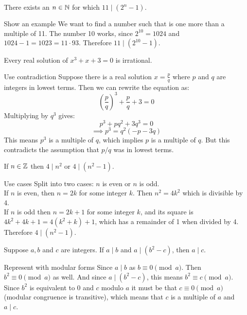 \documentclass{article}
\begin{document}
\begin{problem}
There exists an $n \in \mathbb{N}$ for which $11 \mid (2^n - 1)$.
\end{problem}
\begin{solution}{Show an example}
    We want to find a number such that is one more than a multiple of 11. The number 10 works, since $2^{10} = 1024$ and $1024 - 1 = 1023 = 11\cdot 93$. Therefore $11 \mid (2^{10} - 1)$.
\end{solution}

\begin{problem}
Every real solution of $x^3 +x + 3 = 0$ is irrational.
\end{problem}
\begin{solution}{Use contradiction}
    Suppose there is a real solution $x = \frac{p}{q}$ where $p$ and $q$ are integers in lowest terms. Then we can rewrite the equation as:
    $$\left(\frac{p}{q}\right)^3 + \frac{p}{q} + 3 = 0$$
    Multiplying by $q^3$ gives:
    $$p^3 + pq^2 + 3q^3 = 0$$
    $$\implies p^3 = q^2(-p - 3q)$$
    This means $p^3$ is a multiple of $q$, which implies $p$ is a multiple of $q$. But this contradicts the assumption that $p/q$ was in lowest terms.
\end{solution}

\begin{problem}
If $ n \in \mathbb{Z}$ then $4 \mid n^2$ or $4 \mid (n^2 - 1)$.
\end{problem}
\begin{solution}{Use cases}
    Split into two cases: $n$ is even or $n$ is odd.
    \\

    If $n$ is even, then $n = 2k$ for some integer $k$. Then $n^2 = 4k^2$ which is divisible by 4.
    \\

    If $n$ is odd then $n = 2k + 1$ for some integer $k$, and its square is $4k^2 + 4k + 1 = 4(k^2 + k) + 1$, which has a remainder of 1 when divided by 4. Therefore $4 \mid (n^2 - 1)$.
\end{solution}

\begin{problem}
Suppose $a, b$ and $c$ are integers. If $a \mid b$ and $a \mid (b^2 - c)$, then $a \mid c$.
\end{problem}
\begin{solution}{Represent with modular forms}
    Since $a \mid b$ as $b \equiv 0 \pmod{a}$. Then $b^2 \equiv 0 \pmod{a}$ as well. And since $a \mid (b^2 - c)$, this means $b^2 \equiv c \pmod{a}$. Since $b^2$ is equivalent to 0 and $c$ modulo $a$ it must be that $c \equiv 0 \pmod{a}$ (modular congruence is transitive), which means that $c$ is a multiple of $a$ and $a \mid c$.
\end{solution}
\end{document}
